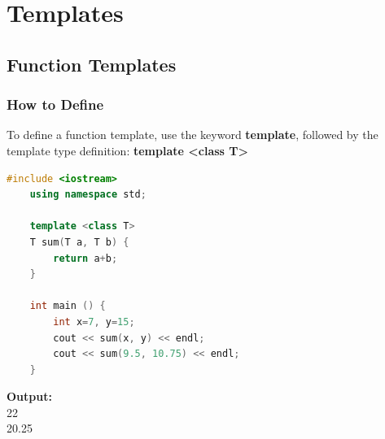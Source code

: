 \documentclass[12pt , a4paper]{article}
\newcommand{\hl}[1]{\colorbox{coolblack}{\color{cream}\textbf{#1}\color{black}}}
\begin{document}
\section{Templates}
	\subsection{Function Templates}
	\subsubsection{How to Define}
	To define a function template, use the keyword \textbf{template}, followed by the template type definition: \hl{template <class T>}\\
	\begin{lstlisting}[language=C++]
	#include <iostream>
	using namespace std;
	
	template <class T>
	T sum(T a, T b) {
	    return a+b;
	}
	
	int main () {
	    int x=7, y=15;
	    cout << sum(x, y) << endl;
	    cout << sum(9.5, 10.75) << endl;
	}		
	\end{lstlisting}

	\begin{tcolorbox}
	\textbf{Output:}\\
	22\\
	20.25\\
	\end{tcolorbox}
\end{document}
